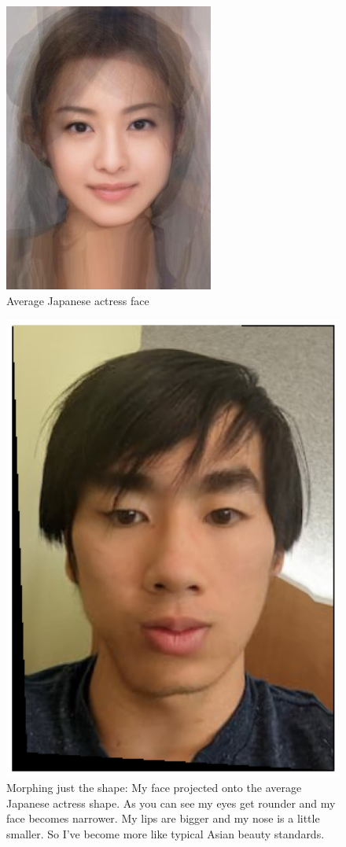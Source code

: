 \documentclass{article}
\begin{document}
\begin{figure}[!htb]
    \centering
    \includegraphics[scale=0.5]{avgjapactress.jpg}
    \caption{Average Japanese actress face}
\end{figure}

\begin{figure}[!htb]
    \centering
    \includegraphics[scale=0.5]{im10.png}
    \caption{Morphing just the shape: My face projected onto the average Japanese actress shape. As you can see my eyes get rounder and my face becomes narrower. My lips are bigger and my nose is a little smaller. So I've become more like typical Asian beauty standards.}
\end{figure}
\end{document}
